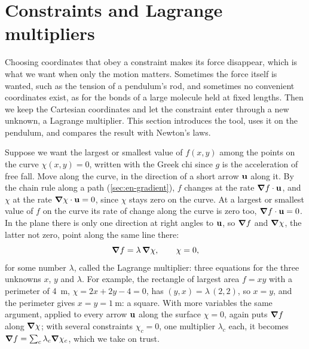 \section{Constraints and Lagrange multipliers}
\label{sec:la-multipliers}

Choosing coordinates that obey a constraint makes its force disappear,
which is what we want when only the motion matters. Sometimes the force
itself is wanted, such as the tension of a pendulum's rod, and sometimes no
convenient coordinates exist, as for the bonds of a large molecule held at
fixed lengths. Then we keep the Cartesian coordinates and let the
constraint enter through a new unknown, a Lagrange multiplier. This
section introduces the tool, uses it on the pendulum, and compares the
result with Newton's laws.

\begin{toolbox}
Suppose we want the largest or smallest value of $f(x, y)$ among the
points on the curve $\chi(x, y) = 0$, written with the Greek chi since $g$
is the acceleration of free fall. Move along the curve, in the direction
of a short arrow $\bm{\mathrm{u}}$ along it. By the chain rule along a path
(\cref{sec:en-gradient}), $f$ changes at the rate $\bm{\nabla} f\cdot\bm{\mathrm{u}}$,
and $\chi$ at the rate $\bm{\nabla}\chi\cdot\bm{\mathrm{u}} = 0$, since $\chi$ stays zero
on the curve. At a largest or smallest value of $f$ on the curve its rate
of change along the curve is zero too, $\bm{\nabla} f\cdot\bm{\mathrm{u}} = 0$. In the
plane there is only one direction at right angles to $\bm{\mathrm{u}}$, so $\bm{\nabla}
f$ and $\bm{\nabla}\chi$, the latter not zero, point along the same line there:
\begin{equation*}
   \bm{\nabla} f = \lambda\,\bm{\nabla}\chi , \qquad \chi = 0 ,
\end{equation*}
for some number $\lambda$, called the Lagrange multiplier: three equations
for the three unknowns $x$, $y$ and $\lambda$. For example, the rectangle
of largest area $f = xy$ with a perimeter of \SI{4}{\metre}, $\chi = 2x +
2y - 4 = 0$, has $(y, x) = \lambda\,(2, 2)$, so $x = y$, and the perimeter
gives $x = y = \SI{1}{\metre}$: a square. With more variables the same
argument, applied to every arrow $\bm{\mathrm{u}}$ along the surface $\chi = 0$,
again puts $\bm{\nabla} f$ along $\bm{\nabla}\chi$; with several constraints $\chi_c =
0$, one multiplier $\lambda_c$ each, it becomes $\bm{\nabla} f =
\sum_c\lambda_c\bm{\nabla}\chi_c$, which we take on trust.
\end{toolbox}

